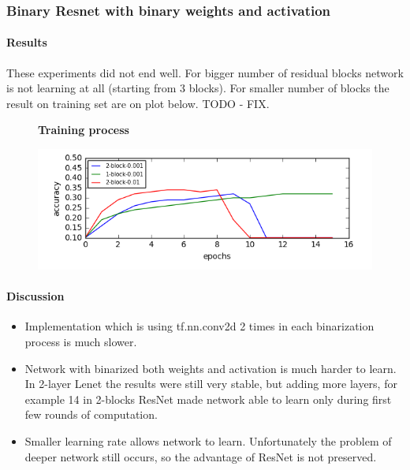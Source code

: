 \documentclass[licencjacka]{pracamgr}
\begin{document}
			\subsubsection{Binary Resnet with binary weights and activation}
			        \paragraph{Results} 
			        
			        These experiments did not end well. For bigger number of residual blocks network is not learning at all (starting from 3 blocks). For smaller number of blocks the result on training set are on plot below. TODO - FIX.
			        \begin{figure}[H]
			        \centering
			        \textbf{Training process}\par\medskip
			        \includegraphics[scale=0.7]{wykres}
			\end{figure}
			        \paragraph{Discussion} 
			        
			        \begin{itemize}
			                \item Implementation which is using tf.nn.conv2d 2 times in each binarization process is much slower. 
			                \item Network with binarized both weights and activation is much harder to learn. In 2-layer Lenet the results were still very stable, but adding more layers, for example 14 in 2-blocks ResNet made network able to learn only during first few rounds of computation.
			                \item Smaller learning rate allows network to learn. Unfortunately the problem of deeper network still occurs, so the advantage of ResNet is not preserved.
			        \end{itemize}
\end{document}
